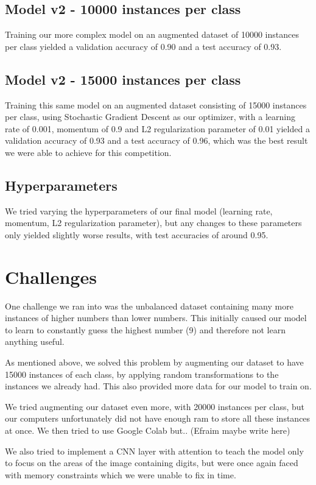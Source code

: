 \documentclass[12pt]{article}
\begin{document}
\subsection{Model v2 - 10000 instances per class}
Training our more complex model on an augmented dataset of 10000 instances per class yielded a validation accuracy of 0.90 and a test accuracy of 0.93.

\subsection{Model v2 - 15000 instances per class}
Training this same model on an augmented dataset consisting of 15000 instances per class, using Stochastic Gradient Descent as our optimizer, with a learning rate of 0.001, momentum of 0.9 and L2 regularization parameter of 0.01 yielded a validation accuracy of 0.93 and a test accuracy of 0.96, which was the best result we were able to achieve for this competition.

\subsection{Hyperparameters}
We tried varying the hyperparameters of our final model (learning rate, momentum, L2 regularization parameter), but any changes to these parameters only yielded slightly worse results, with test accuracies of around 0.95.
\section{Challenges}
One challenge we ran into was the unbalanced dataset containing many more instances of higher numbers than lower numbers. This initially caused our model to learn to constantly guess the highest number (9) and therefore not learn anything useful. 

As mentioned above, we solved this problem by augmenting our dataset to have 15000 instances of each class, by applying random transformations to the instances we already had. This also provided more data for our model to train on.

We tried augmenting our dataset even more, with 20000 instances per class, but our computers unfortunately did not have enough ram to store all these instances at once. We then tried to use Google Colab but.. (Efraim maybe write here)

We also tried to implement a CNN layer with attention to teach the model only to focus on the areas of the image containing digits, but were once again faced with memory constraints which we were unable to fix in time.
\end{document}
